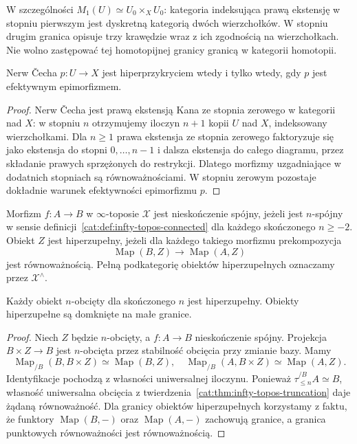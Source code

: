 W szczególności $M_1(U)\simeq U_0\times_X U_0$: kategoria indeksująca prawą ekstensję w stopniu pierwszym jest dyskretną kategorią dwóch wierzchołków. W stopniu drugim granica opisuje trzy krawędzie wraz z ich zgodnością na wierzchołkach. Nie wolno zastępować tej homotopijnej granicy granicą w kategorii homotopii.

\begin{stwierdzenie}\label{cat:prop:infty-topos-cech-hypercover}
Nerw Čecha $p:U\to X$ jest hiperprzykryciem wtedy i tylko wtedy, gdy $p$ jest efektywnym epimorfizmem.
\end{stwierdzenie}
\begin{proof}
Nerw Čecha jest prawą ekstensją Kana ze stopnia zerowego w kategorii nad $X$: w stopniu $n$ otrzymujemy iloczyn $n+1$ kopii $U$ nad $X$, indeksowany wierzchołkami. Dla $n\geq1$ prawa ekstensja ze stopnia zerowego faktoryzuje się jako ekstensja do stopni $0,\ldots,n-1$ i dalsza ekstensja do całego diagramu, przez składanie prawych sprzężonych do restrykcji. Dlatego morfizmy uzgadniające w dodatnich stopniach są równoważnościami. W stopniu zerowym pozostaje dokładnie warunek efektywności epimorfizmu $p$.
\end{proof}

\begin{definicja}[Hiperzupełność]\label{cat:def:infty-topos-hypercomplete}
Morfizm $f:A\to B$ w $\infty$-toposie $\mathcal X$ jest nieskończenie spójny, jeżeli jest $n$-spójny w sensie definicji~\ref{cat:def:infty-topos-connected} dla każdego skończonego $n\geq-2$. Obiekt $Z$ jest hiperzupełny, jeżeli dla każdego takiego morfizmu prekompozycja
\[
 \operatorname{Map}(B,Z)\longrightarrow\operatorname{Map}(A,Z)
\]
jest równoważnością. Pełną podkategorię obiektów hiperzupełnych oznaczamy przez $\mathcal X^\wedge$.
\end{definicja}

\begin{stwierdzenie}\label{cat:prop:infty-topos-truncated-hypercomplete}
Każdy obiekt $n$-obcięty dla skończonego $n$ jest hiperzupełny. Obiekty hiperzupełne są domknięte na małe granice.
\end{stwierdzenie}
\begin{proof}
Niech $Z$ będzie $n$-obcięty, a $f:A\to B$ nieskończenie spójny. Projekcja $B\times Z\to B$ jest $n$-obcięta przez stabilność obcięcia przy zmianie bazy. Mamy
\[
 \operatorname{Map}_{/B}(B,B\times Z)\simeq\operatorname{Map}(B,Z),
 \quad
 \operatorname{Map}_{/B}(A,B\times Z)\simeq\operatorname{Map}(A,Z).
\]
Identyfikacje pochodzą z własności uniwersalnej iloczynu. Ponieważ $\tau_{\leq n}^{/B}A\simeq B$, własność uniwersalna obcięcia z twierdzenia~\ref{cat:thm:infty-topos-truncation} daje żądaną równoważność. Dla granicy obiektów hiperzupełnych korzystamy z faktu, że funktory $\operatorname{Map}(B,-)$ oraz $\operatorname{Map}(A,-)$ zachowują granice, a granica punktowych równoważności jest równoważnością.
\end{proof}

